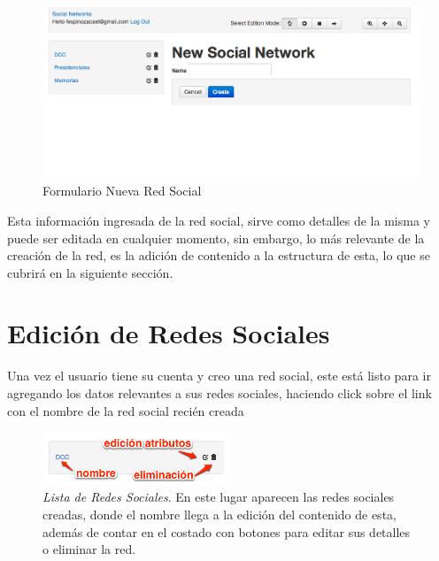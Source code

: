 \begin{figure}[H]
  \centering
  \includegraphics[width=1.0\textwidth]{images/new_social_network.png}
  \caption{Formulario Nueva Red Social}
  \label{new_social_network}
\end{figure}

Esta información ingresada de la red social, sirve como detalles de la misma y puede ser editada en cualquier momento, sin embargo, lo más relevante de la creación de la red, es la adición de contenido a la estructura de esta, lo que se cubrirá en la siguiente sección.


\section{Edición de Redes Sociales} %
\label{sec:edicion_de_redes_sociales}

Una vez el usuario tiene su cuenta y creo una red social, este está listo para ir agregando los datos relevantes a sus redes sociales, haciendo click sobre el link con el nombre de la red social recién creada

\begin{figure}[H]
  \centering
  \includegraphics[width=0.5\textwidth]{images/lista_redes_sociales.png}
  \caption[Lista de Redes Sociales]{\emph{Lista de Redes Sociales}. En este lugar aparecen las redes sociales creadas, donde el nombre llega a la edición del contenido de esta, además de contar en el costado con botones para editar sus detalles o eliminar la red.}
  \label{lista_redes_sociales}
\end{figure}

